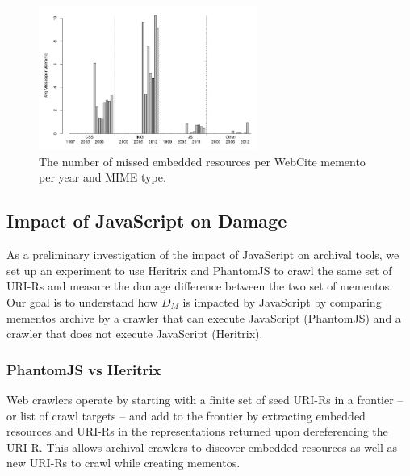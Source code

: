 \begin{figure}[h!]
\includegraphics[width=270px]{./imgs/FileTypes_webcite.png}
\caption{The number of missed embedded resources per WebCite memento per year and MIME type.
}
\label{occstatsWC}
\end{figure}


\subsection{Impact of JavaScript on Damage}
\label{wcjs}


As a preliminary investigation of the impact of JavaScript on archival tools, we set up an experiment to use Heritrix and PhantomJS \cite{pjs} to crawl the same set of URI-Rs and measure the damage difference between the two set of mementos. Our goal is to understand how $D_M$ is impacted by JavaScript by comparing mementos archive by a crawler that can execute JavaScript (PhantomJS) and a crawler that does not execute JavaScript (Heritrix).

\subsubsection{PhantomJS vs Heritrix}
Web crawlers operate by starting with a finite set of seed URI-Rs in a frontier -- or list of crawl targets -- and add to the frontier by extracting embedded resources and URI-Rs in the representations returned upon dereferencing the URI-R. This allows archival crawlers to discover embedded resources as well as new URI-Rs to crawl while creating mementos. 


